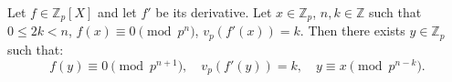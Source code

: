 Let $f \in \mathbb{Z}_p[X]$ and let $f'$ be its derivative. Let $x \in \mathbb{Z}_p$, $n, k \in \mathbb{Z}$ such that $0 \leq 2k < n$, $f(x) \equiv 0 \pmod{p^n}$, $v_p(f'(x)) = k$. Then there exists $y \in \mathbb{Z}_p$ such that:
$$f(y) \equiv 0 \pmod{p^{n+1}}, \quad v_p(f'(y)) = k, \quad y \equiv x \pmod{p^{n-k}}.$$
